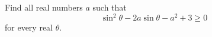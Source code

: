 Find all real numbers \(a\) such that
\[
\sin^2\theta-2a\sin\theta-a^2+3\ge 0
\]
for every real \(\theta\).
